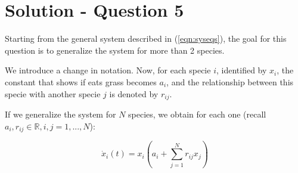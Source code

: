 \section*{Solution - Question 5}
Starting from the general system described in (\ref{eqn:syseqs}), the goal for this question is to generalize the system for more than 2 species.



We introduce a change in notation. Now, for each specie $i$, identified by $x_i$, the constant that shows if eats grass becomes $a_i$, and the relationship between this specie with another specie $j$ is denoted by $r_{ij}$.

If we generalize the system for $N$ species, we obtain for each one (recall $a_i,r_{ij} \in \mathbb{R}, i,j=1,...,N$):

$$ \dot{x}_i(t) = x_i \left(a_i + \sum_{j=1}^N r_{ij}x_j\right)$$
